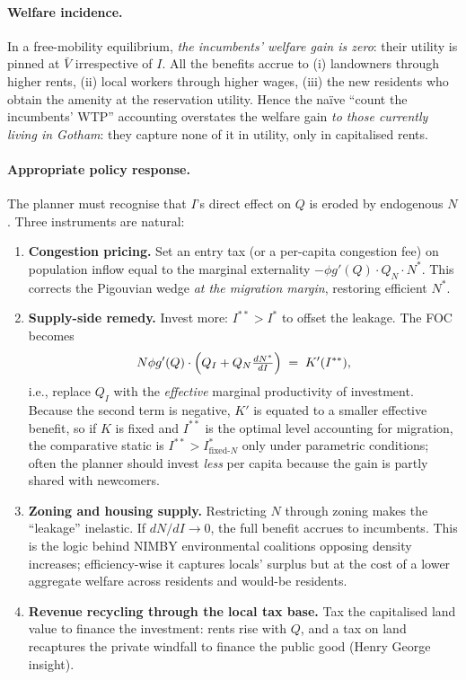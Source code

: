 \documentclass[11pt,a4paper]{article}
\begin{document}
\paragraph{Welfare incidence.}
In a free-mobility equilibrium, \emph{the incumbents' welfare gain is zero}: their utility is pinned at $\bar V$ irrespective of $I$. All the benefits accrue to (i) landowners through higher rents, (ii) local workers through higher wages, (iii) the new residents who obtain the amenity at the reservation utility. Hence the naïve ``count the incumbents' WTP'' accounting overstates the welfare gain \emph{to those currently living in Gotham}: they capture none of it in utility, only in capitalised rents.

\paragraph{Appropriate policy response.}
The planner must recognise that $I$'s direct effect on $Q$ is eroded by endogenous $N$. Three instruments are natural:
\begin{enumerate}[leftmargin=*,itemsep=2pt]
    \item \textbf{Congestion pricing.} Set an entry tax (or a per-capita congestion fee) on population inflow equal to the marginal externality $-\phi g'(Q)\cdot Q_{N}\cdot N^{*}$. This corrects the Pigouvian wedge \emph{at the migration margin}, restoring efficient $N^{*}$.
    \item \textbf{Supply-side remedy.} Invest more: $I^{**}>I^{*}$ to offset the leakage. The FOC becomes
    \[
    N\phi g'(Q)\cdot\Bigl(Q_{I}+Q_{N}\tfrac{dN^{*}}{dI}\Bigr)\;=\;K'(I^{**}),
    \]
    i.e., replace $Q_{I}$ with the \emph{effective} marginal productivity of investment. Because the second term is negative, $K'$ is equated to a smaller effective benefit, so if $K$ is fixed and $I^{**}$ is the optimal level accounting for migration, the comparative static is $I^{**}>I^{*}_{\text{fixed-}N}$ only under parametric conditions; often the planner should invest \emph{less} per capita because the gain is partly shared with newcomers.
    \item \textbf{Zoning and housing supply.} Restricting $N$ through zoning makes the ``leakage'' inelastic. If $dN/dI\to 0$, the full benefit accrues to incumbents. This is the logic behind NIMBY environmental coalitions opposing density increases; efficiency-wise it captures locals' surplus but at the cost of a lower aggregate welfare across residents and would-be residents.
    \item \textbf{Revenue recycling through the local tax base.} Tax the capitalised land value to finance the investment: rents rise with $Q$, and a tax on land recaptures the private windfall to finance the public good (Henry George insight).
\end{enumerate}
\end{document}
